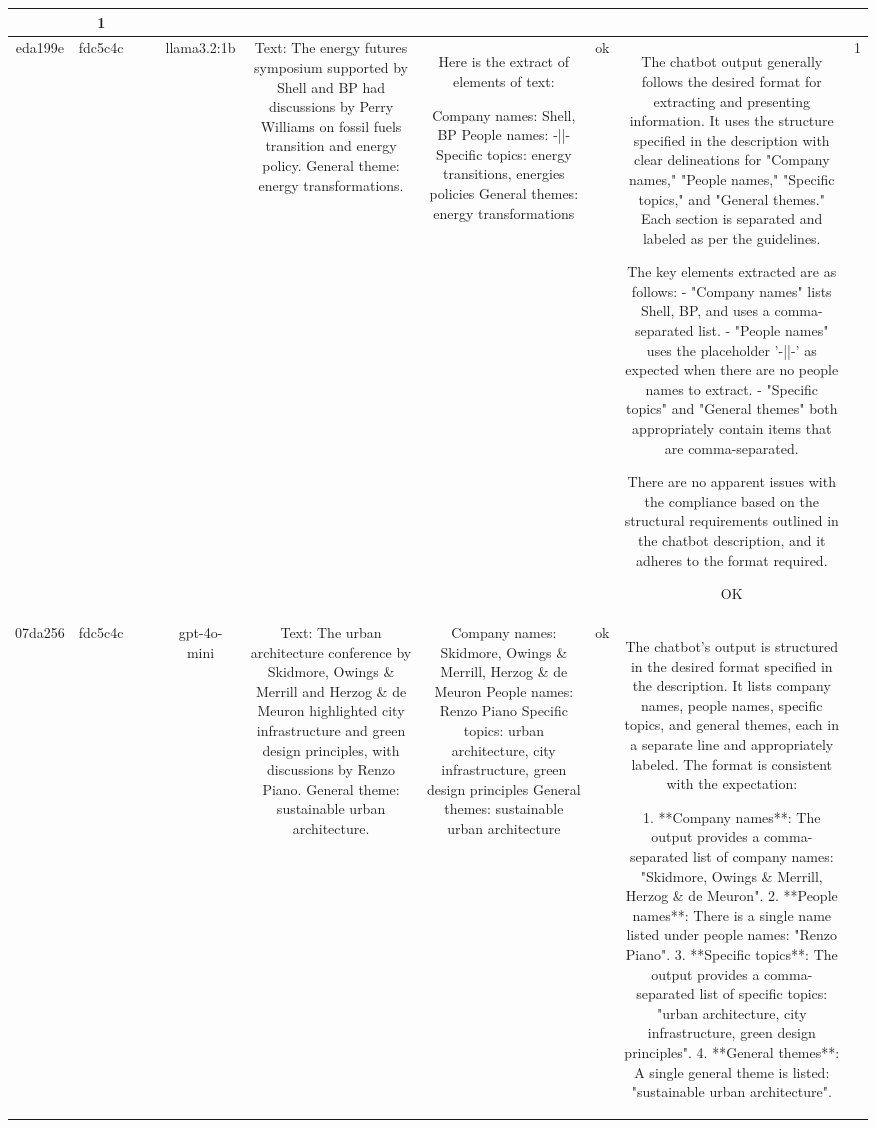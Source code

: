 \begin{table}[h!]
\begin{tabular}{|c|c|c|c|c|c|c|c|c|c|}
{ERR & 1\\
\hline
eda199e & fdc5c4c &  &  & llama3.2:1b & Text: The energy futures symposium supported by Shell and BP had discussions by Perry Williams on fossil fuels transition and energy policy. General theme: energy transformations. & Here is the extract of elements of text:

Company names: Shell, BP
People names: -||-
Specific topics: energy transitions, energies policies
General themes: energy transformations & ok & The chatbot output generally follows the desired format for extracting and presenting information. It uses the structure specified in the description with clear delineations for "Company names," "People names," "Specific topics," and "General themes." Each section is separated and labeled as per the guidelines. 

The key elements extracted are as follows:
- "Company names" lists Shell, BP, and uses a comma-separated list.
- "People names" uses the placeholder '-||-' as expected when there are no people names to extract.
- "Specific topics" and "General themes" both appropriately contain items that are comma-separated.

There are no apparent issues with the compliance based on the structural requirements outlined in the chatbot description, and it adheres to the format required.

OK & 1\\
\hline
07da256 & fdc5c4c &  &  & gpt-4o-mini & Text: The urban architecture conference by Skidmore, Owings \& Merrill and Herzog \& de Meuron highlighted city infrastructure and green design principles, with discussions by Renzo Piano. General theme: sustainable urban architecture. & Company names: Skidmore, Owings \& Merrill, Herzog \& de Meuron  
People names: Renzo Piano  
Specific topics: urban architecture, city infrastructure, green design principles  
General themes: sustainable urban architecture   & ok & The chatbot's output is structured in the desired format specified in the description. It lists company names, people names, specific topics, and general themes, each in a separate line and appropriately labeled. The format is consistent with the expectation:

1. **Company names**: The output provides a comma-separated list of company names: "Skidmore, Owings \& Merrill, Herzog \& de Meuron".
2. **People names**: There is a single name listed under people names: "Renzo Piano".
3. **Specific topics**: The output provides a comma-separated list of specific topics: "urban architecture, city infrastructure, green design principles".
4. **General themes**: A single general theme is listed: "sustainable urban architecture".

}
\end{tabular}
\end{table}
